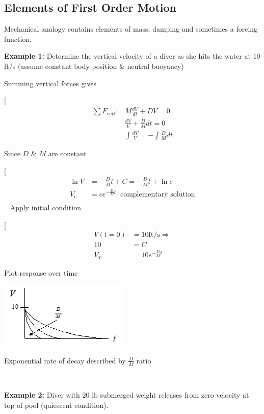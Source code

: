 \documentclass[
]{book}
\begin{document}
\hypertarget{elements-of-first-order-motion}{%
\subsection{Elements of First Order Motion}\label{elements-of-first-order-motion}}

Mechanical analogy contains elements of mass, damping and sometimes a forcing function.

\textbf{Example 1:} Determine the vertical velocity of a diver as she hits the water at \(10\) ft/s (assume constant body position \& neutral buoyancy)

Summing vertical forces gives

{[}
\begin{align}
\sum F_{\mathrm{vert}} : &M \frac{dV}{dt} + DV = 0 \\
&\frac{dV}{V} + \frac{D}{M} dt = 0 \\
&\int{}{} \frac{dV}{V} = -\int{}{} \frac{D}{M} dt
\end{align}

Since \(D\) \& \(M\) are constant

{[}
\begin{align}
\ln V &= -\frac{D}{M} t + C =  -\frac{D}{M} t + \ln c\\
V_c &= c e^{-\frac{D}{M} t} \;\;\text{complementary solution}\\
\end{align}
~
Apply initial condition

{[}
\begin{align}
V(t=0) &= 10 \mathrm{ft/s} \Rightarrow \\
10 &= C \\
V_T &= 10 e^{-\frac{D}{M} t}
\end{align}

Plot response over time

\includegraphics{media/08/image5.png}

Exponential rate of decay described by \(\frac{D}{M}\) ratio

~

\textbf{Example 2:} Diver with \(20\) lb submerged weight releases from zero velocity at top of pool (quiescent condition).
\end{document}
